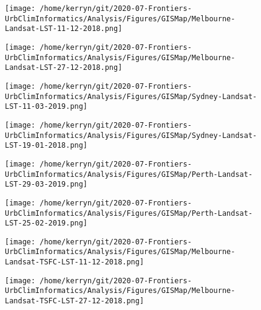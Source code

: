 \documentclass{article}
\begin{document}
\begin{figure}
\centering    
\texttt{[image: /home/kerryn/git/2020-07-Frontiers-UrbClimInformatics/Analysis/Figures/GISMap/Melbourne-Landsat-LST-11-12-2018.png]}
\end{figure} 
\clearpage


\begin{figure}
\centering    
\texttt{[image: /home/kerryn/git/2020-07-Frontiers-UrbClimInformatics/Analysis/Figures/GISMap/Melbourne-Landsat-LST-27-12-2018.png]}
\end{figure} 
\clearpage

\begin{figure}
\centering    
\texttt{[image: /home/kerryn/git/2020-07-Frontiers-UrbClimInformatics/Analysis/Figures/GISMap/Sydney-Landsat-LST-11-03-2019.png]}
\end{figure} 
\clearpage


\begin{figure}
\centering    
\texttt{[image: /home/kerryn/git/2020-07-Frontiers-UrbClimInformatics/Analysis/Figures/GISMap/Sydney-Landsat-LST-19-01-2018.png]}
\end{figure} 
\clearpage

\begin{figure}
\centering    
\texttt{[image: /home/kerryn/git/2020-07-Frontiers-UrbClimInformatics/Analysis/Figures/GISMap/Perth-Landsat-LST-29-03-2019.png]}
\end{figure} 
\clearpage


\begin{figure}
\centering    
\texttt{[image: /home/kerryn/git/2020-07-Frontiers-UrbClimInformatics/Analysis/Figures/GISMap/Perth-Landsat-LST-25-02-2019.png]}
\end{figure} 
\clearpage



\begin{figure}
\centering    
\texttt{[image: /home/kerryn/git/2020-07-Frontiers-UrbClimInformatics/Analysis/Figures/GISMap/Melbourne-Landsat-TSFC-LST-11-12-2018.png]}
\end{figure} 
\clearpage


\begin{figure}
\centering    
\texttt{[image: /home/kerryn/git/2020-07-Frontiers-UrbClimInformatics/Analysis/Figures/GISMap/Melbourne-Landsat-TSFC-LST-27-12-2018.png]}
\end{figure} 
\clearpage
\end{document}
